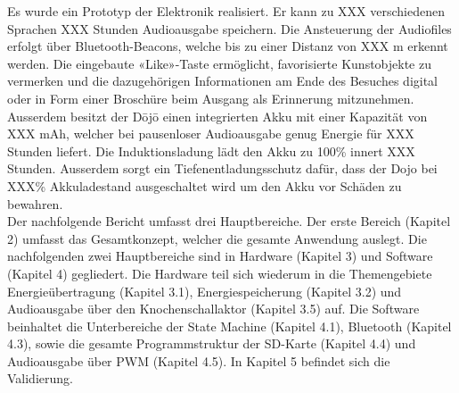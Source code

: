 Es wurde ein Prototyp der Elektronik realisiert. Er kann zu XXX verschiedenen Sprachen XXX Stunden Audioausgabe speichern. Die Ansteuerung der Audiofiles erfolgt über Bluetooth-Beacons, welche bis zu einer Distanz von XXX m erkennt werden. Die eingebaute «Like»-Taste ermöglicht, favorisierte Kunstobjekte zu vermerken und die dazugehörigen Informationen am Ende des Besuches digital oder in Form einer Broschüre beim Ausgang als Erinnerung mitzunehmen. Ausserdem besitzt der Dōjō einen integrierten Akku mit einer Kapazität von XXX mAh, welcher bei pausenloser Audioausgabe genug Energie für XXX Stunden liefert. Die Induktionsladung lädt den Akku zu 100\% innert XXX Stunden. Ausserdem sorgt ein Tiefenentladungsschutz dafür, dass der Dojo bei XXX\% Akkuladestand ausgeschaltet wird um den Akku vor Schäden zu bewahren.\\
Der nachfolgende Bericht umfasst drei Hauptbereiche. Der erste Bereich (Kapitel 2) umfasst das Gesamtkonzept, welcher die gesamte Anwendung auslegt. Die nachfolgenden zwei Hauptbereiche sind in Hardware (Kapitel 3) und Software (Kapitel 4) gegliedert. Die Hardware teil sich wiederum in die Themengebiete Energieübertragung (Kapitel 3.1), Energiespeicherung (Kapitel 3.2) und Audioausgabe über den Knochenschallaktor (Kapitel 3.5) auf. Die Software beinhaltet die Unterbereiche der State Machine (Kapitel 4.1), Bluetooth (Kapitel 4.3), sowie die gesamte Programmstruktur der SD-Karte (Kapitel 4.4) und Audioausgabe über PWM (Kapitel 4.5). In Kapitel 5 befindet sich die Validierung.\\
